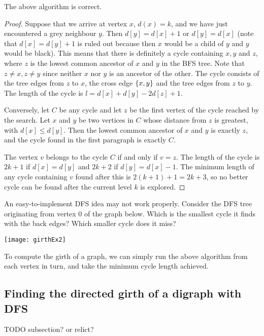 \begin{Theorem}
\label{thm:BFS-cycle} 
The above algorithm is correct.
\end{Theorem}
\begin{proof}
Suppose that we arrive at vertex $x$, $d(x) = k$, and we have just
encountered a grey neighbour $y$. Then $d[y] = d[x] + 1$ or $d[y] = d[x]$
(note that $d[x] = d[y] + 1$ is ruled out because then $x$ would be a
child of $y$ and $y$ would be black). This means that there is definitely
a cycle containing $x, y$ and $z$, where $z$ is the lowest common ancestor
of $x$ and $y$ in the BFS tree. Note that $z\neq x, z\neq y$ since neither
$x$ nor $y$ is an ancestor of the other. The cycle consists of the tree
edges from $z$ to $x$, the cross edge $\mbox{$\{x,y\}$}$ and the tree edges
from $z$ to $y$. The length of the cycle is $l=d[x] + d[y] - 2 d[z] + 1$.

Conversely, let $C$ be any cycle and let $z$ be the first vertex of
the cycle reached by the search. Let $x$ and $y$ be two vertices in $C$
whose distance  from $z$ is greatest, with $d[x] \leq d[y]$. Then the
lowest common ancestor of  $x$ and $y$ is exactly $z$, and the cycle
found in the first paragraph is exactly $C$.

The vertex $v$ belongs to the cycle $C$ if and only if $v = z$. The
length of the cycle is $2k+1$ if $d[x] = d[y]$ and $2k+2$ if $d[y] =
d[x] - 1$. The minimum length of any cycle containing $v$ found after
this is $2(k+1) + 1 = 2k+3$, so no better cycle can be found after the
current level $k$ is explored.
\end{proof}

\begin{Boxample}
An easy-to-implement DFS idea may not work properly. 
Consider the DFS tree originating from vertex $0$ of the graph below. 
Which is the smallest cycle it finds with the back edges? Which smaller cycle does it miss?
\begin{center}
\texttt{[image: girthEx2]}
\end{center}
\end{Boxample}

To compute the girth of a graph, we can simply run the above algorithm
from each vertex in turn, and take the minimum cycle length achieved.

\subsection{Finding the directed girth of a digraph with DFS}
{\color{red}TODO subsection? or relict?}


